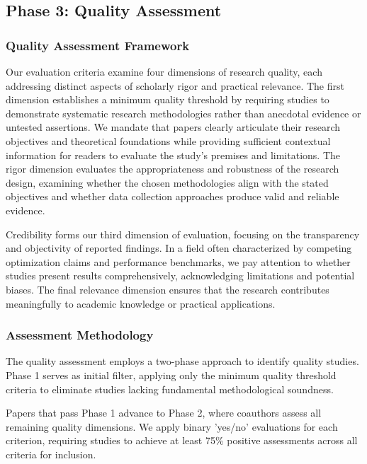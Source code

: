 \documentclass[acmsmall]{acmart}
\begin{document}
\subsection{Phase 3: Quality Assessment}\label{subsec:phase-3-quality-assessment}

\subsubsection{Quality Assessment Framework}\label{subsubsec:phase-3-quality-assessment:quality-assessment-framework}
Our evaluation criteria examine four dimensions of research quality, each addressing distinct aspects of scholarly rigor and practical relevance. The first dimension establishes a minimum quality threshold by requiring studies to demonstrate systematic research methodologies rather than anecdotal evidence or untested assertions. We mandate that papers clearly articulate their research objectives and theoretical foundations while providing sufficient contextual information for readers to evaluate the study's premises and limitations.
The rigor dimension evaluates the appropriateness and robustness of the research design, examining whether the chosen methodologies align with the stated objectives and whether data collection approaches produce valid and reliable evidence.

Credibility forms our third dimension of evaluation, focusing on the transparency and objectivity of reported findings. In a field often characterized by competing optimization claims and performance benchmarks, we pay attention to whether studies present results comprehensively, acknowledging limitations and potential biases. The final relevance dimension ensures that the research contributes meaningfully to academic knowledge or practical applications.

\subsubsection{Assessment Methodology}\label{subsubsec:phase-3-quality-assessment:assessment-methodology}
The quality assessment employs a two-phase approach to  identify quality studies. Phase 1 serves as initial filter, applying only the minimum quality threshold criteria to  eliminate studies lacking fundamental methodological soundness.

Papers that pass Phase 1 advance to Phase 2, where coauthors assess all remaining quality dimensions. We apply binary 'yes/no' evaluations for each criterion, requiring studies to achieve at least 75\% positive assessments across all criteria for inclusion.
\end{document}
